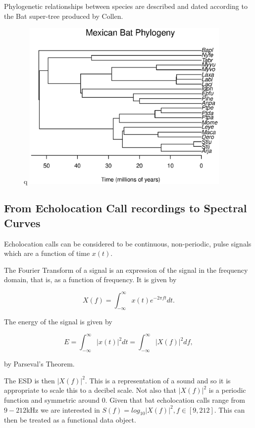 \documentclass[wsdraft]{ws-rv9x6} %
\begin{document}
Phylogenetic relationships between species are described and dated according to the Bat super-tree produced by Collen.\cite{collen2012evolution} 

\begin{figure}
	\centering	q
	\includegraphics[width= 0.9\textwidth]{../Figures/Phylogeny.eps}
\end{figure}

\subsection{From Echolocation Call recordings to Spectral Curves}

Echolocation calls can be considered to be continuous, non-periodic, pulse signals which are a function of time \(x(t)\).

The Fourier Transform of a signal is an expression of the signal in the frequency domain, that is, as a function of frequency. It is given by 

\[
X(f) = \int_{-\infty}^{\infty} x(t) e^{-2\pi ft} dt.
\]

The energy of the signal is given by 

\[E = \int_{-\infty}^{\infty} |x(t)|^2 dt = \int_{-\infty}^{\infty} |X(f)|^2 df,\]

by Parseval's Theorem.

The ESD is then \(|X(f)|^2\). This is a representation of a sound and so it is appropriate to scale this to a decibel scale. Not also that \(|X(f)|^2\) is a periodic function and symmetric around 0. Given that bat echolocation calls range from \(9 - 212\)kHz we are interested in \(S(f) = log_{10} |X(f)|^2, f \in [9, 212] \). This can then be treated as a functional data object.
\end{document}
